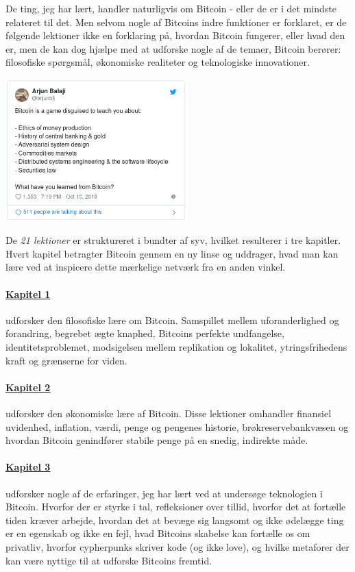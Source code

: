 \documentclass[paper=6in:9in,pagesize=pdftex,
               headinclude=on,footinclude=on,12pt]{scrbook}
\begin{document}
De ting, jeg har lært, handler naturligvis om Bitcoin - eller de er i det mindste relateret til det. Men selvom nogle af Bitcoins indre funktioner er forklaret, er de følgende lektioner ikke en forklaring på, hvordan Bitcoin fungerer, eller hvad den er, men de kan dog hjælpe med at udforske nogle af de temaer, Bitcoin berører: filosofiske spørgsmål, økonomiske realiteter og teknologiske innovationer.\begin{center}
  \includegraphics[width=7cm]{assets/images/the-tweet.png}
\end{center}

De \textit{21 lektioner} er struktureret i bundter af syv, hvilket resulterer i tre kapitler. Hvert kapitel betragter Bitcoin gennem en ny linse og uddrager, hvad man kan lære ved at inspicere dette mærkelige netværk fra en anden vinkel.\paragraph{\hyperref[ch:philosophy]{Kapitel 1}}{udforsker den filosofiske lære om Bitcoin. Samspillet mellem uforanderlighed og forandring, begrebet ægte knaphed, Bitcoins perfekte undfangelse, identitetsproblemet, modsigelsen mellem replikation og lokalitet, ytringsfrihedens kraft og grænserne for viden. }

\paragraph{\hyperref[ch:economics]{Kapitel 2}}{udforsker den økonomiske lære af Bitcoin. Disse lektioner omhandler finansiel uvidenhed, inflation, værdi, penge og pengenes historie, brøkreservebankvæsen og hvordan Bitcoin genindfører stabile penge på en snedig, indirekte måde.}

\paragraph{\hyperref[ch:technology]{Kapitel 3}}{udforsker nogle af de erfaringer, jeg har lært ved at undersøge teknologien i Bitcoin. Hvorfor der er styrke i tal, refleksioner over tillid, hvorfor det at fortælle tiden kræver arbejde, hvordan det at bevæge sig langsomt og ikke ødelægge ting er en egenskab og ikke en fejl, hvad Bitcoins skabelse kan fortælle os om privatliv, hvorfor cypherpunks skriver kode (og ikke love), og hvilke metaforer der kan være nyttige til at udforske Bitcoins fremtid.}
\end{document}
